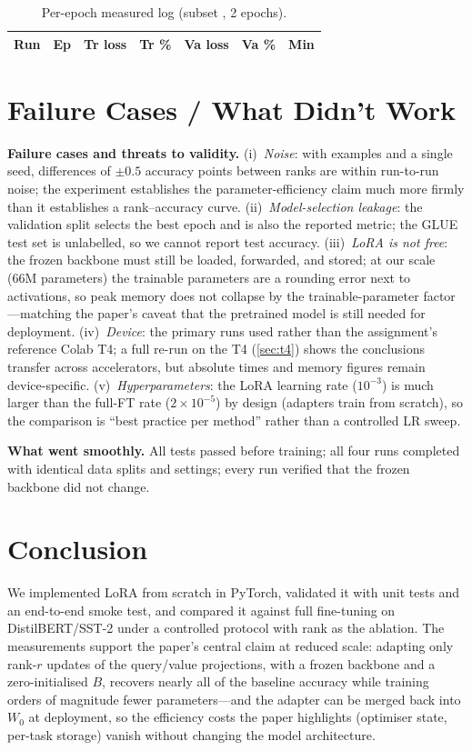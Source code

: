 \documentclass[conference]{IEEEtran}
\begin{document}
\begin{table}[t]
\centering
\caption{Per-epoch measured log (subset \SubsetSize{}, 2 epochs).}
\label{tab:epoch}
\small
\begin{tabular}{llrrrrr}
\hline
Run & Ep & Tr loss & Tr \% & Va loss & Va \% & Min \\
\hline

\end{tabular}
\end{table}

\section{Failure Cases / What Didn't Work}
\label{sec:discussion}
\textbf{Failure cases and threats to validity.}
(i)~\emph{Noise}: with \SubsetSize{} examples and a single seed, differences of
$\pm 0.5$ accuracy points between ranks are within run-to-run noise; the
experiment establishes the parameter-efficiency claim much more firmly than it
establishes a rank--accuracy curve. (ii)~\emph{Model-selection leakage}: the
validation split selects the best epoch and is also the reported metric; the
GLUE test set is unlabelled, so we cannot report test accuracy. (iii)~\emph{LoRA
is not free}: the frozen backbone must still be loaded, forwarded, and stored;
at our scale (66M parameters) the trainable parameters are a rounding error
next to activations, so peak memory does not collapse by the trainable-parameter
factor---matching the paper's caveat that the pretrained model is still needed
for deployment. (iv)~\emph{Device}: the primary runs used \DeviceName{} rather than the
assignment's reference Colab T4; a full re-run on the T4 (\cref{sec:t4})
shows the conclusions transfer across accelerators, but absolute times and
memory figures remain device-specific. (v)~\emph{Hyperparameters}:
the LoRA learning rate ($10^{-3}$) is much larger than the full-FT rate
($2\times10^{-5}$) by design (adapters train from scratch), so the comparison
is ``best practice per method'' rather than a controlled LR sweep.

\textbf{What went smoothly.} All tests passed before training; all four runs
completed with identical data splits and settings; every run verified that the
frozen backbone did not change.

\section{Conclusion}
\label{sec:conclusion}
We implemented LoRA from scratch in PyTorch, validated it with unit tests and
an end-to-end smoke test, and compared it against full fine-tuning on
DistilBERT/SST-2 under a controlled protocol with rank as the ablation. The
measurements support the paper's central claim at reduced scale: adapting only
rank-$r$ updates of the query/value projections, with a frozen backbone and a
zero-initialised $B$, recovers nearly all of the baseline accuracy while
training orders of magnitude fewer parameters---and the adapter can be merged
back into $W_0$ at deployment, so the efficiency costs the paper highlights
(optimiser state, per-task storage) vanish without changing the model
architecture.
\end{document}
